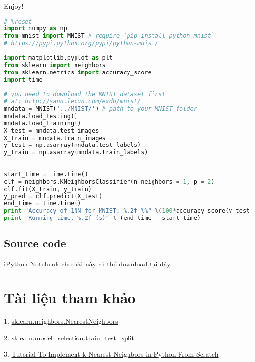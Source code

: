 Enjoy! 
 
 
\begin{lstlisting}[language=Python]
# %reset 
import numpy as np  
from mnist import MNIST # require `pip install python-mnist` 
# https://pypi.python.org/pypi/python-mnist/ 
 
import matplotlib.pyplot as plt 
from sklearn import neighbors 
from sklearn.metrics import accuracy_score 
import time 
 
# you need to download the MNIST dataset first 
# at: http://yann.lecun.com/exdb/mnist/ 
mndata = MNIST('../MNIST/') # path to your MNIST folder  
mndata.load_testing() 
mndata.load_training() 
X_test = mndata.test_images 
X_train = mndata.train_images 
y_test = np.asarray(mndata.test_labels) 
y_train = np.asarray(mndata.train_labels) 
 
 
start_time = time.time() 
clf = neighbors.KNeighborsClassifier(n_neighbors = 1, p = 2) 
clf.fit(X_train, y_train) 
y_pred = clf.predict(X_test) 
end_time = time.time() 
print "Accuracy of 1NN for MNIST: %.2f %%" %(100*accuracy_score(y_test, y_pred)) 
print "Running time: %.2f (s)" % (end_time - start_time) 
\end{lstlisting}
 
 
\subsection{Source code}
iPython Notebook cho bài này có thể \href{https://github.com/tiepvupsu/tiepvupsu.github.io/tree/master/assets/knn/KNN.ipynb}{download tại đây}.  
 
 
\section{Tài liệu tham khảo}
 
1. \href{http://scikit-learn.org/stable/modules/generated/sklearn.neighbors.NearestNeighbors.html#sklearn.neighbors.NearestNeighbors}{sklearn.neighbors.NearestNeighbors} 
 
2. \href{http://scikit-learn.org/stable/modules/generated/sklearn.model_selection.train_test_split.html}{sklearn.model\_selection.train\_test\_split} 
 
3. \href{http://machinelearningmastery.com/tutorial-to-implement-k-nearest-neighbors-in-python-from-scratch/}{Tutorial To Implement k-Nearest Neighbors in Python From Scratch} 
